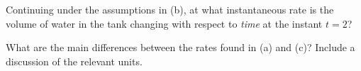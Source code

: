 \begin{exercises}
	\item Continuing under the assumptions in (b), at what instantaneous rate is the volume of water in the tank changing with respect to \emph{time} at the instant $t = 2$?  
	\item What are the main differences between the rates found in (a) and (c)?  Include a discussion of the relevant units.
\ea
\end{exercises}
\afterexercises